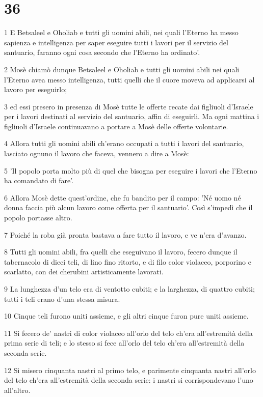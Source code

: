 \chapter{36}

\par 1 E Betsaleel e Oholiab e tutti gli uomini abili, nei quali l'Eterno ha messo sapienza e intelligenza per saper eseguire tutti i lavori per il servizio del santuario, faranno ogni cosa secondo che l'Eterno ha ordinato'.
\par 2 Mosè chiamò dunque Betsaleel e Oholiab e tutti gli uomini abili nei quali l'Eterno avea messo intelligenza, tutti quelli che il cuore moveva ad applicarsi al lavoro per eseguirlo;
\par 3 ed essi presero in presenza di Mosè tutte le offerte recate dai figliuoli d'Israele per i lavori destinati al servizio del santuario, affin di eseguirli. Ma ogni mattina i figliuoli d'Israele continuavano a portare a Mosè delle offerte volontarie.
\par 4 Allora tutti gli uomini abili ch'erano occupati a tutti i lavori del santuario, lasciato ognuno il lavoro che faceva, vennero a dire a Mosè:
\par 5 'Il popolo porta molto più di quel che bisogna per eseguire i lavori che l'Eterno ha comandato di fare'.
\par 6 Allora Mosè dette quest'ordine, che fu bandito per il campo: 'Né uomo né donna faccia più alcun lavoro come offerta per il santuario'. Così s'impedì che il popolo portasse altro.
\par 7 Poiché la roba già pronta bastava a fare tutto il lavoro, e ve n'era d'avanzo.
\par 8 Tutti gli uomini abili, fra quelli che eseguivano il lavoro, fecero dunque il tabernacolo di dieci teli, di lino fino ritorto, e di filo color violaceo, porporino e scarlatto, con dei cherubini artisticamente lavorati.
\par 9 La lunghezza d'un telo era di ventotto cubiti; e la larghezza, di quattro cubiti; tutti i teli erano d'una stessa misura.
\par 10 Cinque teli furono uniti assieme, e gli altri cinque furon pure uniti assieme.
\par 11 Si fecero de' nastri di color violaceo all'orlo del telo ch'era all'estremità della prima serie di teli; e lo stesso si fece all'orlo del telo ch'era all'estremità della seconda serie.
\par 12 Si misero cinquanta nastri al primo telo, e parimente cinquanta nastri all'orlo del telo ch'era all'estremità della seconda serie: i nastri si corrispondevano l'uno all'altro.
